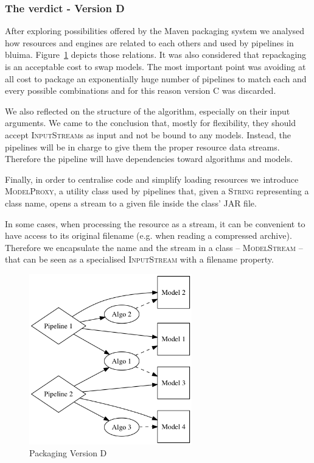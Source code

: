 \documentclass{article}
\newcommand{\ID}[1]{{\textsc{#1}}}
\newcommand{\JAR}{JAR\xspace}
\begin{document}
\subsubsection{The verdict - Version D}

After exploring possibilities offered by the Maven packaging system we analysed how resources and engines are related to each others and used by pipelines in bluima. Figure~\ref{fig:pkgsysD} depicts those relations. It was also considered that repackaging is an acceptable cost to swap models. The most important point was avoiding at all cost to package an exponentially huge number of pipelines to match each and every possible combinations and for this reason version C was discarded.

We also reflected on the structure of the algorithm, especially on their input arguments. We came to the conclusion that, mostly for flexibility, they should accept \ID{InputStream}s as input and not be bound to any models. Instead, the pipelines will be in charge to give them the proper resource data streams. Therefore the pipeline will have dependencies toward algorithms and models.

Finally, in order to centralise code and simplify loading resources we introduce \ID{ModelProxy}, a
utility class used by pipelines that, given a \ID{String} representing a class name, opens a stream
to a given file inside the class' \JAR file.

In some cases, when processing the resource as a stream, it can be convenient to have access to its original filename (e.g. when reading a compressed archive). Therefore we encapsulate the name and the stream in a class -- \ID{ModelStream} -- that can be seen as a specialised \ID{InputStream} with a filename property.

\begin{figure}
\centering
\includegraphics[width=200pt]{res/packaging_version_D.png}
\caption{Packaging Version D}
\label{fig:pkgsysD}
\end{figure}
\end{document}
